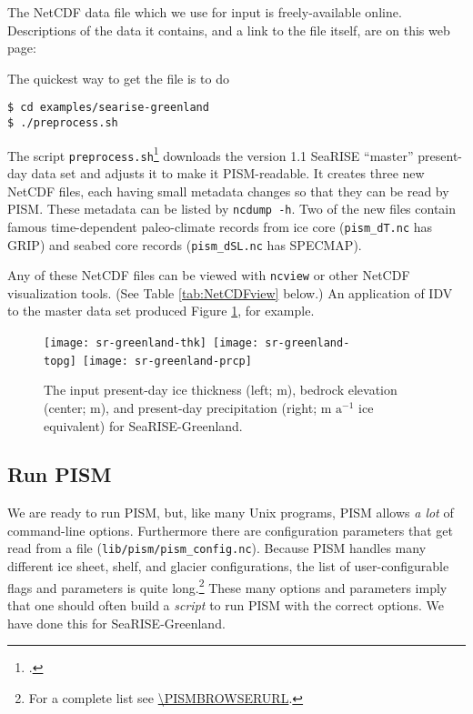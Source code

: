 The NetCDF data file which we use for input is freely-available online.  Descriptions of the data it contains, and a link to the file itself, are on this web page: 
\medskip

\centerline{}
\medskip

\noindent The quickest way to get the file is to do
\begin{verbatim}
$ cd examples/searise-greenland
$ ./preprocess.sh
\end{verbatim}
\noindent The script \texttt{preprocess.sh}\footnote{.} downloads the version 1.1 SeaRISE ``master'' present-day data set and adjusts it to make it PISM-readable.  It creates three new NetCDF files, each having small metadata changes so that they can be read by PISM.  These metadata can be listed by \texttt{ncdump -h}.  Two of the new files contain famous time-dependent paleo-climate records from ice core (\texttt{pism_dT.nc} has GRIP) and seabed core records (\texttt{pism_dSL.nc} has SPECMAP).

Any of these NetCDF files can be viewed with \texttt{ncview} or other NetCDF visualization tools.  (See Table \ref{tab:NetCDFview} below.)  An application of IDV to the master data set produced Figure \ref{fig:sr-input}, for example.

\begin{figure}[ht]
\centering
\mbox{\texttt{[image: sr-greenland-thk]}
  \qquad
  \texttt{[image: sr-greenland-topg]}
  \qquad
  \texttt{[image: sr-greenland-prcp]}}
\caption{The input present-day ice thickness (left; m), bedrock elevation (center; m), and present-day precipitation (right; m $\text{a}^{-1}$ ice equivalent) for SeaRISE-Greenland.}
\label{fig:sr-input}
\end{figure}


\subsection{Run PISM}   \label{subsect:runscript}  We are ready to run PISM, but, like many Unix programs, PISM allows \emph{a lot} of command-line options.  Furthermore there are configuration parameters that get read from a file (\mbox{\texttt{lib/pism/pism_config.nc}}).  Because PISM handles many different ice sheet, shelf, and glacier configurations, the list of user-configurable flags and parameters is quite long.\footnote{For a complete list see \url{\PISMBROWSERURL}.}  These many options and parameters imply that one should often build a \emph{script} to run PISM with the correct options.  We have done this for \mbox{SeaRISE-Greenland}.

